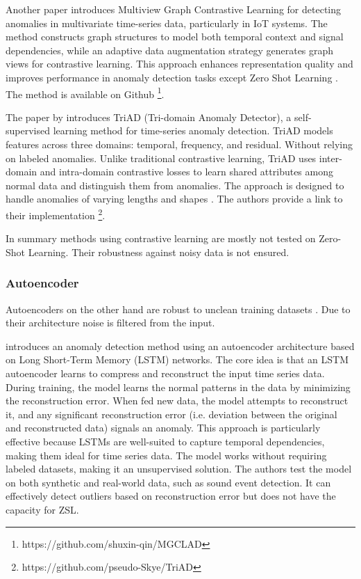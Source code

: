 Another paper introduces Multiview Graph Contrastive Learning for detecting anomalies in multivariate time-series data, particularly in IoT systems. The method constructs graph structures to model both temporal context and signal dependencies, while an adaptive data augmentation strategy generates graph views for contrastive learning. This approach enhances representation quality and improves performance in anomaly detection tasks except Zero Shot Learning \cite{qin_multiview_2023}. The method is available on Github \footnote{\fussy\tiny https://github.com/shuxin-qin/MGCLAD}.

The paper by \cite{sun_unraveling_2023} introduces TriAD (Tri-domain Anomaly Detector), a self-supervised learning method for time-series anomaly detection. TriAD models features across three domains: temporal, frequency, and residual. Without relying on labeled anomalies. Unlike traditional contrastive learning, TriAD uses inter-domain and intra-domain contrastive losses to learn shared attributes among normal data and distinguish them from anomalies. The approach is designed to handle anomalies of varying lengths and shapes \cite{sun_unraveling_2023}. The authors provide a link to their implementation \footnote{\fussy\tiny https://github.com/pseudo-Skye/TriAD}.

In summary methods using contrastive learning are mostly not tested on Zero-Shot Learning. Their robustness against noisy data is not ensured.

\subsubsection{Autoencoder}
Autoencoders on the other hand are robust to unclean training datasets \cite[p. 2487]{abdulaal_practical_2021}. Due to their architecture noise is filtered from the input.

\cite{provotar_unsupervised_2019} introduces an anomaly detection method using an autoencoder architecture based on Long Short-Term Memory (LSTM) networks. The core idea is that an LSTM autoencoder learns to compress and reconstruct the input time series data. During training, the model learns the normal patterns in the data by minimizing the reconstruction error. When fed new data, the model attempts to reconstruct it, and any significant reconstruction error (i.e. deviation between the original and reconstructed data) signals an anomaly. This approach is particularly effective because LSTMs are well-suited to capture temporal dependencies, making them ideal for time series data. The model works without requiring labeled datasets, making it an unsupervised solution. The authors test the model on both synthetic and real-world data, such as sound event detection. It can effectively detect outliers based on reconstruction error but does not have the capacity for ZSL.

